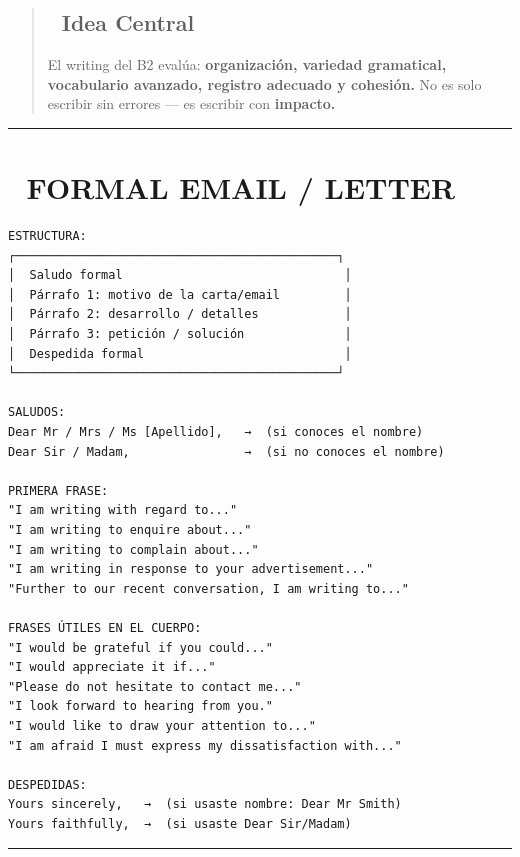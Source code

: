 \documentclass[
  spanish,
  letterpaper,
]{scrbook}
\begin{document}
\begin{quote}
\subsection{🎯 Idea Central}\label{idea-central-17}

El writing del B2 evalúa: \textbf{organización, variedad gramatical,
vocabulario avanzado, registro adecuado y cohesión.} No es solo escribir
sin errores --- es escribir con \textbf{impacto.}
\end{quote}

\begin{center}\rule{0.5\linewidth}{0.5pt}\end{center}

\section{📧 FORMAL EMAIL / LETTER}\label{formal-email-letter}

\begin{verbatim}
ESTRUCTURA:
┌─────────────────────────────────────────────┐
│  Saludo formal                               │
│  Párrafo 1: motivo de la carta/email         │
│  Párrafo 2: desarrollo / detalles            │
│  Párrafo 3: petición / solución              │
│  Despedida formal                            │
└─────────────────────────────────────────────┘

SALUDOS:
Dear Mr / Mrs / Ms [Apellido],   →  (si conoces el nombre)
Dear Sir / Madam,                →  (si no conoces el nombre)

PRIMERA FRASE:
"I am writing with regard to..."
"I am writing to enquire about..."
"I am writing to complain about..."
"I am writing in response to your advertisement..."
"Further to our recent conversation, I am writing to..."

FRASES ÚTILES EN EL CUERPO:
"I would be grateful if you could..."
"I would appreciate it if..."
"Please do not hesitate to contact me..."
"I look forward to hearing from you."
"I would like to draw your attention to..."
"I am afraid I must express my dissatisfaction with..."

DESPEDIDAS:
Yours sincerely,   →  (si usaste nombre: Dear Mr Smith)
Yours faithfully,  →  (si usaste Dear Sir/Madam)
\end{verbatim}

\begin{center}\rule{0.5\linewidth}{0.5pt}\end{center}
\end{document}
